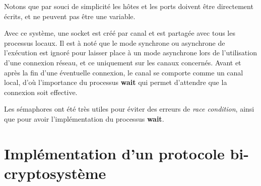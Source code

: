 \documentclass[11pt]{article} %
\begin{document}
Notons que par souci de simplicité les hôtes et les ports doivent être directement écrits, et ne peuvent pas être une variable.

Avec ce système, une socket est créé par canal et est partagée avec tous les processus locaux. Il est à noté que le mode synchrone ou asynchrone de l’exécution est ignoré pour laisser place à un mode asynchrone lors de l'utilisation d'une connexion réseau, et ce uniquement sur les canaux concernés. Avant et après la fin d'une éventuelle connexion, le canal se comporte comme un canal local, d'où l'importance du processus \textbf{wait} qui permet d'attendre que la connexion soit effective.

Les sémaphores ont été très utiles pour éviter des erreurs de \emph{race condition}, ainsi que pour avoir l'implémentation du processus \textbf{wait}.

\section{Implémentation d'un protocole bi-cryptosystème} %
\end{document}
